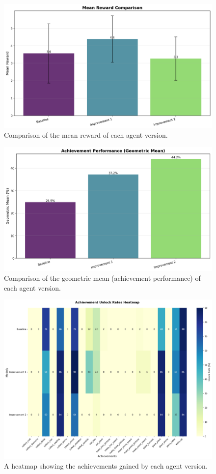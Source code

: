 \documentclass[twocolumn]{article}
\begin{document}
\begin{figure}[H]
	\centering
	\includegraphics[width=0.8\linewidth]{images/DQNImprov2mean_reward_comparison.png}
	\caption{Comparison of the mean reward of each agent version.}
	\label{fig:dqn_comp_mean_reward}
\end{figure}
\vspace{-10pt}
\begin{figure}[H]
	\centering
	\includegraphics[width=0.8\linewidth]{images/DQNImprov2geometric_mean_comparison.png}
	\caption{Comparison of the geometric mean (achievement performance) of each agent version.}
	\label{fig:dqn_comp_geo_mean}
\end{figure}
\vspace{-10pt}
\begin{figure}[H]
	\centering
	\includegraphics[width=0.8\linewidth]{images/DQNImprov2achievement_heatmap.png}
	\caption{A heatmap showing the achievements gained by each agent version.}
	\label{fig:dqn_comp_heatmap}
\end{figure}
\end{document}
